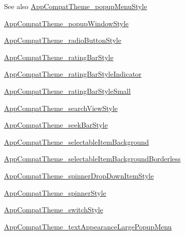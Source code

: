 \begin{DoxySeeAlso}{See also}
\hyperlink{classandroid_1_1support_1_1v7_1_1mediarouter_1_1R_1_1styleable_a56f5c9d8f50624e515a07a5936318b79}{App\+Compat\+Theme\+\_\+popup\+Menu\+Style} 

\hyperlink{classandroid_1_1support_1_1v7_1_1mediarouter_1_1R_1_1styleable_a1c2df8e2b925ae4820688441763caf8b}{App\+Compat\+Theme\+\_\+popup\+Window\+Style} 

\hyperlink{classandroid_1_1support_1_1v7_1_1mediarouter_1_1R_1_1styleable_a8dc461bdd424e8433282468c37c8d386}{App\+Compat\+Theme\+\_\+radio\+Button\+Style} 

\hyperlink{classandroid_1_1support_1_1v7_1_1mediarouter_1_1R_1_1styleable_ab10f79a17ff8b7943d3a05296cc7e765}{App\+Compat\+Theme\+\_\+rating\+Bar\+Style} 

\hyperlink{classandroid_1_1support_1_1v7_1_1mediarouter_1_1R_1_1styleable_adbfc1fbc4a808f8fe9c21f5cebc0979e}{App\+Compat\+Theme\+\_\+rating\+Bar\+Style\+Indicator} 

\hyperlink{classandroid_1_1support_1_1v7_1_1mediarouter_1_1R_1_1styleable_a851e1e8d644ea5c0306da068a33f70d1}{App\+Compat\+Theme\+\_\+rating\+Bar\+Style\+Small} 

\hyperlink{classandroid_1_1support_1_1v7_1_1mediarouter_1_1R_1_1styleable_ae78fcc03ef34fe74c5a9824c9cb8df51}{App\+Compat\+Theme\+\_\+search\+View\+Style} 

\hyperlink{classandroid_1_1support_1_1v7_1_1mediarouter_1_1R_1_1styleable_a94480fbd3dc2f8051c48e89dbc33eab6}{App\+Compat\+Theme\+\_\+seek\+Bar\+Style} 

\hyperlink{classandroid_1_1support_1_1v7_1_1mediarouter_1_1R_1_1styleable_ae6b277bbde29a995524dbf2f764ec5b8}{App\+Compat\+Theme\+\_\+selectable\+Item\+Background} 

\hyperlink{classandroid_1_1support_1_1v7_1_1mediarouter_1_1R_1_1styleable_a4b17798c04e6d1bb8e749b5feb1aae89}{App\+Compat\+Theme\+\_\+selectable\+Item\+Background\+Borderless} 

\hyperlink{classandroid_1_1support_1_1v7_1_1mediarouter_1_1R_1_1styleable_a7d8b19a24b9742bcfc7efca0b97d4088}{App\+Compat\+Theme\+\_\+spinner\+Drop\+Down\+Item\+Style} 

\hyperlink{classandroid_1_1support_1_1v7_1_1mediarouter_1_1R_1_1styleable_ad25bcd6aab6c43bde798b7d59a6ad960}{App\+Compat\+Theme\+\_\+spinner\+Style} 

\hyperlink{classandroid_1_1support_1_1v7_1_1mediarouter_1_1R_1_1styleable_a45f08971148574331038a7defe008f80}{App\+Compat\+Theme\+\_\+switch\+Style} 

\hyperlink{classandroid_1_1support_1_1v7_1_1mediarouter_1_1R_1_1styleable_acfb438324ed2a40724401765634c986a}{App\+Compat\+Theme\+\_\+text\+Appearance\+Large\+Popup\+Menu} 


\end{DoxySeeAlso}
